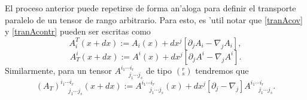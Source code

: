 El proceso anterior puede repetirse de forma an'aloga para definir
el transporte paralelo de un tensor de rango arbitrario. Para esto, es 'util notar que 
\eqref{tranAcov} y \eqref{tranAcontr} pueden ser escritas como
\begin{equation}
A^T_i(x+dx):=A_i(x)+dx^j\left[\partial_jA_i-\nabla_jA_i\right],
\end{equation}
\begin{equation}
A_T^i(x+dx):=A^i(x)+dx^j\left[\partial_jA^i-\nabla_jA^i\right].
\end{equation}
Similarmente, para un tensor $A^{i_1\cdots i_r}_{\ \ \ \ \ \ j_1\cdots j_s}$ de tipo $(^r_s)$ tendremos que
\begin{equation}
(A_T)^{i_1\cdots i_r}_{\ \ \ \ \ \ j_1\cdots j_s}(x+dx):=A^{i_1\cdots i_r}_{\ \ \ \ \ \ j_1\cdots j_s}(x)+dx^j\left[\partial_j-\nabla_j\right]A^{i_1\cdots i_r}_{\ \ \ \ \ \ j_1\cdots j_s}.
\end{equation}


